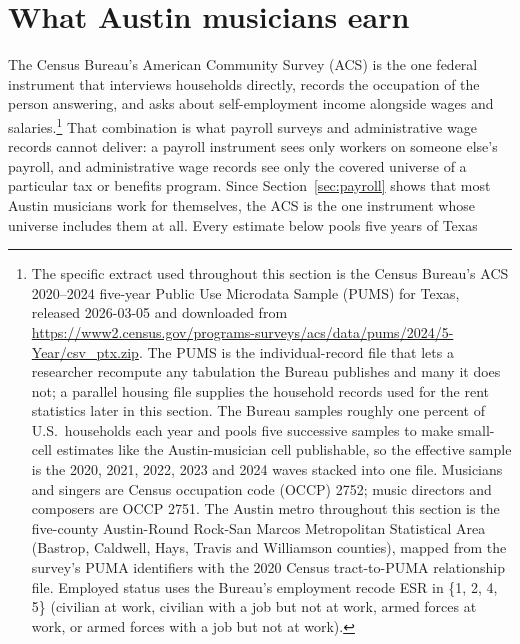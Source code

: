 \section{What Austin musicians earn}
\label{sec:earnings}

The Census Bureau's American Community Survey (ACS) is the one federal
instrument that interviews households directly, records the occupation of the
person answering, and asks about self-employment income alongside wages and
salaries.\footnote{The specific extract used throughout this section is the
Census Bureau's ACS 2020--2024 five-year Public Use Microdata Sample (PUMS) for
Texas, released 2026-03-05 and downloaded from
\url{https://www2.census.gov/programs-surveys/acs/data/pums/2024/5-Year/csv_ptx.zip}.
The PUMS is the individual-record file that lets a researcher recompute any
tabulation the Bureau publishes and many it does not; a parallel housing file
supplies the household records used for the rent statistics later in this
section. The Bureau samples roughly one percent of U.S.\ households each year
and pools five successive samples to make small-cell estimates like the
Austin-musician cell publishable, so the effective sample is the 2020, 2021,
2022, 2023 and 2024 waves stacked into one file. Musicians and singers are
Census occupation code (OCCP) 2752; music directors and composers are OCCP
2751. The Austin metro throughout this section is the five-county
Austin-Round Rock-San Marcos Metropolitan Statistical Area (Bastrop, Caldwell,
Hays, Travis and Williamson counties), mapped from the survey's PUMA
identifiers with the 2020 Census tract-to-PUMA relationship file. Employed
status uses the Bureau's employment recode ESR in \{1, 2, 4, 5\} (civilian at
work, civilian with a job but not at work, armed forces at work, or armed
forces with a job but not at work).} That combination is what payroll surveys
and administrative wage records cannot deliver: a payroll instrument sees only
workers on someone else's payroll, and administrative wage records see only
the covered universe of a particular tax or benefits program. Since
Section~\ref{sec:payroll} shows that most Austin musicians work for
themselves, the ACS is the one instrument whose universe includes them at all.
Every estimate below pools five years of Texas
